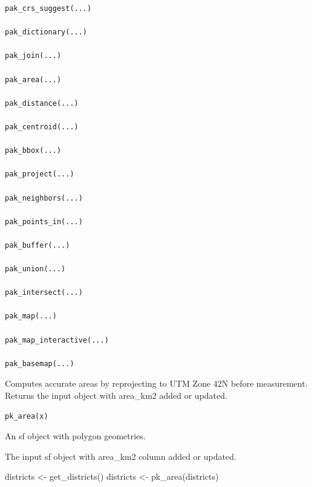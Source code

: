 \documentclass[a4paper]{book}
\begin{document}
\begin{Usage}
\begin{verbatim}
pak_crs_suggest(...)

pak_dictionary(...)

pak_join(...)

pak_area(...)

pak_distance(...)

pak_centroid(...)

pak_bbox(...)

pak_project(...)

pak_neighbors(...)

pak_points_in(...)

pak_buffer(...)

pak_union(...)

pak_intersect(...)

pak_map(...)

pak_map_interactive(...)

pak_basemap(...)
\end{verbatim}
\end{Usage}
%
\begin{Description}
Computes accurate areas by reprojecting to UTM Zone 42N before
measurement. Returns the input object with area\_km2 added or updated.
\end{Description}
%
\begin{Usage}
\begin{verbatim}
pk_area(x)
\end{verbatim}
\end{Usage}
%
\begin{Arguments}
\begin{ldescription}
\item[\code{x}] An sf object with polygon geometries.
\end{ldescription}
\end{Arguments}
%
\begin{Value}
The input sf object with area\_km2 column added or updated.
\end{Value}
%
\begin{Examples}
\begin{ExampleCode}

  districts <- get_districts()
  districts <- pk_area(districts)

\end{ExampleCode}
\end{Examples}
\end{document}
